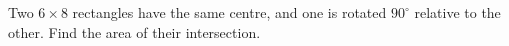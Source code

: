 Two $6\times8$ rectangles have the same centre, and one is rotated $90^\circ$ relative to the other. Find the area of their intersection.
